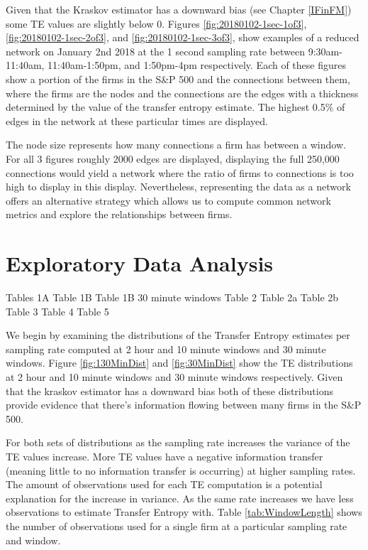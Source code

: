 Given that the Kraskov estimator has a downward bias (see Chapter \ref{IFinFM}) some TE values are slightly below 0.  Figures \ref{fig:20180102-1sec-1of3},  \ref{fig:20180102-1sec-2of3},  and \ref{fig:20180102-1sec-3of3},  show examples of a reduced network on January 2nd 2018 at the 1 second sampling rate between 9:30am-11:40am, 11:40am-1:50pm, and 1:50pm-4pm respectively.   Each of these figures show a portion of the firms in the S\&P 500 and the connections between them, where the firms are the nodes and the connections are the edges with a thickness determined by the value of the transfer entropy estimate.  The highest 0.5\% of edges in the network at these particular times are displayed.  

The node size represents how many connections a firm has between a window.  For all 3 figures roughly 2000 edges are displayed, displaying the full 250,000 connections would yield a network where the ratio of firms to connections is too high to display in this display.  Nevertheless,  representing the data as a network offers an alternative strategy which allows us to compute common network metrics and explore the relationships between firms.

\section{Exploratory Data Analysis}

Tables 1A
Table 1B 
Table 1B 30 minute windows
Table 2
Table 2a
Table 2b
Table 3
Table 4
Table 5

We begin by examining the distributions of the Transfer Entropy estimates per sampling rate computed at 2 hour and 10 minute windows and 30 minute windows.  Figure \ref{fig:130MinDist} and \ref{fig:30MinDist} show  the TE distributions at 2 hour and 10 minute windows and 30 minute windows respectively.  Given that the kraskov estimator has a downward bias both of these distributions provide evidence that there's information flowing between many firms in the S\&P 500.

For both sets of distributions as the sampling rate increases the variance of the TE values increase.  More TE values have a negative information transfer (meaning little to no information transfer is occurring) at higher sampling rates.  The amount of observations used for each TE computation is a potential explanation for the increase in variance.  As the same rate increases we have less observations to estimate Transfer Entropy with. Table \ref{tab:WindowLength} shows the number of observations used for a single firm at a particular sampling rate and window.

